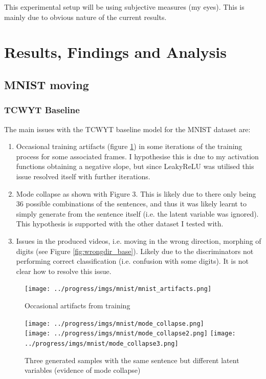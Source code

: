 \documentclass{report}
\theoremstyle{plain}
\theoremstyle{definition}
\theoremstyle{remark}
\numberwithin{equation}{section}
\numberwithin{figure}{section}
\newcommand{\<}{\langle}
\renewcommand{\>}{\rangle}
\begin{document}
This experimental setup will be using subjective measures (my eyes). This is mainly due to obvious nature of the current results.

\section{Results, Findings and Analysis}

\subsection{MNIST moving}

\subsubsection{TCWYT Baseline}

The main issues with the TCWYT baseline model for the MNIST dataset are:
\begin{enumerate}
    \item Occasional training artifacts (figure \ref{fig:artifacts_base}) in some iterations of the training process for some associated frames. I hypothesise this is due to my activation functions obtaining a negative slope, but since LeakyReLU was utilised this issue resolved itself with further iterations.
    \item Mode collapse as shown with Figure 3. This is likely due to there only being 36 possible combinations of the sentences, and thus it was likely learnt to simply generate from the sentence itself (i.e. the latent variable was ignored). This hypothesis is supported with the other dataset I tested with.
    \item Issues in the produced videos, i.e. moving in the wrong direction, morphing of digits (see Figure \ref{fig:wrongdir_base}). Likely due to the discriminators not performing correct classification (i.e. confusion with some digits). It is not clear how to resolve this issue.
\end{enumerate}

\begin{figure}[H] \label{fig:artifacts_base}
    \centering
    \caption{Occasional artifacts from training}
    \texttt{[image: ../progress/imgs/mnist/mnist\_artifacts.png]}
\end{figure}

\begin{figure}[H] \label{fig:modecollapse_base}
    \centering
    \caption{Three generated samples with the same sentence but different latent variables (evidence of mode collapse)}
    \texttt{[image: ../progress/imgs/mnist/mode\_collapse.png]}\\
    \texttt{[image: ../progress/imgs/mnist/mode\_collapse2.png]}
    \texttt{[image: ../progress/imgs/mnist/mode\_collapse3.png]}
\end{figure}
\end{document}
